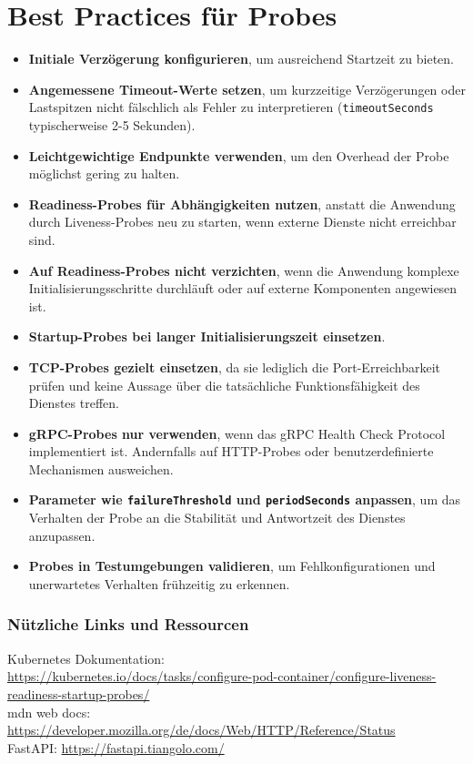 \section{Best Practices für Probes}
\begin{itemize}
    \item \textbf{Initiale Verzögerung konfigurieren}, um ausreichend Startzeit zu bieten.
    
    \item \textbf{Angemessene Timeout-Werte setzen}, um kurzzeitige Verzögerungen oder Lastspitzen nicht fälschlich als Fehler zu interpretieren (\texttt{timeoutSeconds} typischerweise 2-5 Sekunden).
    
    \item \textbf{Leichtgewichtige Endpunkte verwenden}, um den Overhead der Probe möglichst gering zu halten.
    
    \item \textbf{Readiness-Probes für Abhängigkeiten nutzen}, anstatt die Anwendung durch Liveness-Probes neu zu starten, wenn externe Dienste nicht erreichbar sind.
    
    \item \textbf{Auf Readiness-Probes nicht verzichten}, wenn die Anwendung komplexe Initialisierungsschritte durchläuft oder auf externe Komponenten angewiesen ist.
    
    \item \textbf{Startup-Probes bei langer Initialisierungszeit einsetzen}.
    
    \item \textbf{TCP-Probes gezielt einsetzen}, da sie lediglich die Port-Erreichbarkeit prüfen und keine Aussage über die tatsächliche Funktionsfähigkeit des Dienstes treffen.
    
    \item \textbf{gRPC-Probes nur verwenden}, wenn das gRPC Health Check Protocol implementiert ist. Andernfalls auf HTTP-Probes oder benutzerdefinierte Mechanismen ausweichen.
    
    \item \textbf{Parameter wie \texttt{failureThreshold} und \texttt{periodSeconds} anpassen}, um das Verhalten der Probe an die Stabilität und Antwortzeit des Dienstes anzupassen.
    
    \item \textbf{Probes in Testumgebungen validieren}, um Fehlkonfigurationen und unerwartetes Verhalten frühzeitig zu erkennen.
\end{itemize}


\subsubsection{Nützliche Links und Ressourcen}
Kubernetes Dokumentation:\\
\url{https://kubernetes.io/docs/tasks/configure-pod-container/configure-liveness-readiness-startup-probes/}\\
mdn web docs: \url{https://developer.mozilla.org/de/docs/Web/HTTP/Reference/Status}\\
FastAPI: \url{https://fastapi.tiangolo.com/}
